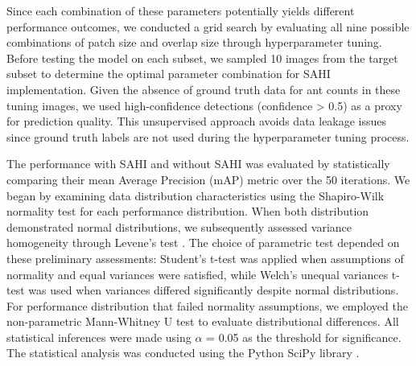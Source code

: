 Since each combination of these parameters potentially yields different performance outcomes, we conducted a grid search by evaluating all nine possible combinations of patch size and overlap size through hyperparameter tuning. Before testing the model on each subset, we sampled 10 images from the target subset to determine the optimal parameter combination for SAHI implementation. Given the absence of ground truth data for ant counts in these tuning images, we used high-confidence detections (confidence > 0.5) as a proxy for prediction quality. This unsupervised approach avoids data leakage issues since ground truth labels are not used during the hyperparameter tuning process.

The performance with SAHI and without SAHI was evaluated by statistically comparing their mean Average Precision (mAP) metric over the 50 iterations. We began by examining data distribution characteristics using the Shapiro-Wilk normality test \cite{shapiro_analysis_1965} for each performance distribution. When both distribution demonstrated normal distributions, we subsequently assessed variance homogeneity through Levene's test \cite{levene_robust_1960}.  The choice of parametric test depended on these preliminary assessments: Student's t-test was applied when assumptions of normality and equal variances were satisfied, while Welch's unequal variances t-test \cite{welch_generalization_1947} was used when variances differed significantly despite normal distributions. For performance distribution that failed normality assumptions, we employed the non-parametric Mann-Whitney U test \cite{mann_test_1947} to evaluate distributional differences. All statistical inferences were made using $\alpha$ = 0.05 as the threshold for significance. The statistical analysis was conducted using the Python SciPy library \cite{virtanen_scipy_2020}.
